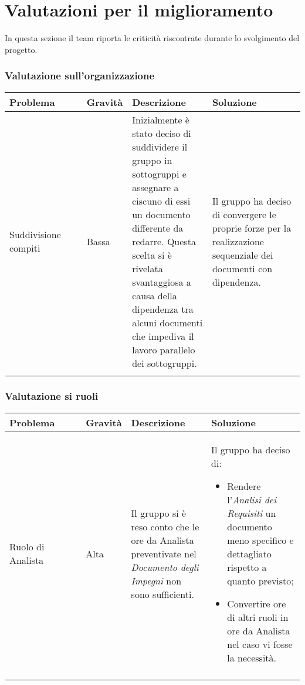 \chapter{Valutazioni per il miglioramento}
In questa sezione il team riporta le criticità riscontrate durante lo svolgimento del progetto.

\subsection{Valutazione sull'organizzazione}
\begin{table}[H]
    \centering
    \begin{tabular}{|p{0.27\linewidth}|p{0.11\linewidth}|p{0.29\linewidth}|p{0.33\linewidth}|}
    \hline
    \rowcolor[HTML]{036400}
    {\color[HTML]{FFFFFF} \textbf{Problema}} & {\color[HTML]{FFFFFF} \textbf{Gravità}} & {\color[HTML]{FFFFFF} \textbf{Descrizione}} & {\color[HTML]{FFFFFF} \textbf{Soluzione}} \\ \hline
    \rowcolor[HTML]{EFEFEF}
    Suddivisione compiti& Bassa & Inizialmente è stato deciso di suddividere il gruppo in sottogruppi e assegnare a ciscuno di essi un documento differente da redarre. Questa scelta si è rivelata svantaggiosa a causa della dipendenza tra alcuni documenti che impediva il lavoro parallelo dei sottogruppi. & Il gruppo ha deciso di convergere le proprie forze per la realizzazione sequenziale dei documenti con dipendenza. \\ \hline
    \rowcolor[HTML]{C0C0C0}
    \end{tabular}
\end{table}



\subsection{Valutazione si ruoli}
\begin{table}[H]
    \centering
    \begin{tabular}{|p{0.27\linewidth}|p{0.11\linewidth}|p{0.29\linewidth}|p{0.33\linewidth}|}
    \hline
    \rowcolor[HTML]{036400}
    {\color[HTML]{FFFFFF} \textbf{Problema}} & {\color[HTML]{FFFFFF} \textbf{Gravità}} & {\color[HTML]{FFFFFF} \textbf{Descrizione}} & {\color[HTML]{FFFFFF} \textbf{Soluzione}} \\ \hline
    \rowcolor[HTML]{EFEFEF}
    Ruolo di Analista& Alta & Il gruppo si è reso conto che le ore da Analista preventivate nel \textit{Documento degli Impegni} non sono sufficienti. & Il gruppo ha deciso di: 
    \begin{itemize}
        \item Rendere l'\textit{Analisi dei Requisiti} un documento meno specifico e dettagliato rispetto a quanto previsto;
        \item Convertire ore di altri ruoli in ore da Analista nel caso vi fosse la necessità.
    \end{itemize}   \\ \hline
    \rowcolor[HTML]{C0C0C0}
    \end{tabular}
\end{table}


